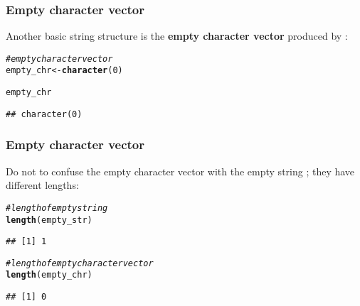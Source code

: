 \documentclass[12pt]{beamer}\usepackage[]{graphicx}\usepackage[]{color}
\makeatletter
\newcommand{\hlnum}[1]{\textcolor[rgb]{0.686,0.059,0.569}{#1}}%
\newcommand{\hlcom}[1]{\textcolor[rgb]{0.678,0.584,0.686}{\textit{#1}}}%
\newcommand{\hlstd}[1]{\textcolor[rgb]{0.345,0.345,0.345}{#1}}%
\newcommand{\hlkwb}[1]{\textcolor[rgb]{0.69,0.353,0.396}{#1}}%
\newcommand{\hlkwd}[1]{\textcolor[rgb]{0.737,0.353,0.396}{\textbf{#1}}}%
\newenvironment{kframe}{%
 \def\at@end@of@kframe{}%
 \ifinner\ifhmode%
  \def\at@end@of@kframe{\end{minipage}}%
  \begin{minipage}{\columnwidth}%
 \fi\fi%
 \def\FrameCommand##1{\hskip\@totalleftmargin \hskip-\fboxsep
 \colorbox{shadecolor}{##1}\hskip-\fboxsep
     \hskip-\linewidth \hskip-\@totalleftmargin \hskip\columnwidth}%
 \MakeFramed {\advance\hsize-\width
   \@totalleftmargin\z@ \linewidth\hsize
   \@setminipage}}%
 {\par\unskip\endMakeFramed%
 \at@end@of@kframe}
\newenvironment{knitrout}{}{} %
\makeatother
\begin{document}
\begin{frame}[fragile]
\frametitle{Empty character vector}

Another basic string structure is the \textbf{empty character vector} produced by :
\begin{knitrout}\footnotesize
{}\color{fgcolor}\begin{kframe}
\begin{alltt}
\hlcom{# empty character vector}
\hlstd{empty_chr} \hlkwb{<-} \hlkwd{character}\hlstd{(}\hlnum{0}\hlstd{)}

\hlstd{empty_chr}
\end{alltt}
\begin{verbatim}
## character(0)
\end{verbatim}
\end{kframe}
\end{knitrout}

\end{frame}


\begin{frame}[fragile]
\frametitle{Empty character vector}

Do not to confuse the empty character vector  with the empty string ; they have different lengths:
\begin{knitrout}\footnotesize
{}\color{fgcolor}\begin{kframe}
\begin{alltt}
\hlcom{# length of empty string}
\hlkwd{length}\hlstd{(empty_str)}
\end{alltt}
\begin{verbatim}
## [1] 1
\end{verbatim}
\begin{alltt}
\hlcom{# length of empty character vector}
\hlkwd{length}\hlstd{(empty_chr)}
\end{alltt}
\begin{verbatim}
## [1] 0
\end{verbatim}
\end{kframe}
\end{knitrout}

\end{frame}

\end{document}
